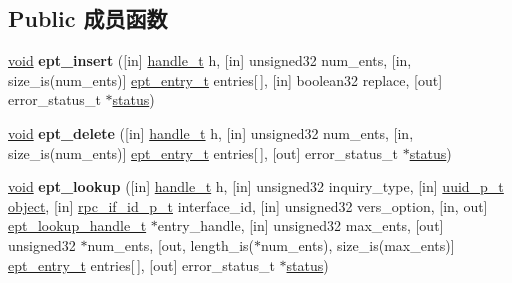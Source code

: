 \subsection*{Public 成员函数}
\begin{DoxyCompactItemize}
\item 
\mbox{\label{interfaceepm_a60394e4aeadf34ac922f81f2950dc4c7}} 
\hyperlink{interfacevoid}{void} {\bfseries ept\+\_\+insert} (\mbox{[}in\mbox{]} \hyperlink{interfacevoid}{handle\+\_\+t} h, \mbox{[}in\mbox{]} unsigned32 num\+\_\+ents, \mbox{[}in, size\+\_\+is(num\+\_\+ents)\mbox{]} \hyperlink{structepm_1_1ept__entry__t}{ept\+\_\+entry\+\_\+t} entries\mbox{[}$\,$\mbox{]}, \mbox{[}in\mbox{]} boolean32 replace, \mbox{[}out\mbox{]} error\+\_\+status\+\_\+t $\ast$\hyperlink{structstatus}{status})
\item 
\mbox{\label{interfaceepm_a5c89ac83dbaa05e366c88149b9bffb86}} 
\hyperlink{interfacevoid}{void} {\bfseries ept\+\_\+delete} (\mbox{[}in\mbox{]} \hyperlink{interfacevoid}{handle\+\_\+t} h, \mbox{[}in\mbox{]} unsigned32 num\+\_\+ents, \mbox{[}in, size\+\_\+is(num\+\_\+ents)\mbox{]} \hyperlink{structepm_1_1ept__entry__t}{ept\+\_\+entry\+\_\+t} entries\mbox{[}$\,$\mbox{]}, \mbox{[}out\mbox{]} error\+\_\+status\+\_\+t $\ast$\hyperlink{structstatus}{status})
\item 
\mbox{\label{interfaceepm_a409b2be128843f25059a8392f8249bb1}} 
\hyperlink{interfacevoid}{void} {\bfseries ept\+\_\+lookup} (\mbox{[}in\mbox{]} \hyperlink{interfacevoid}{handle\+\_\+t} h, \mbox{[}in\mbox{]} unsigned32 inquiry\+\_\+type, \mbox{[}in\mbox{]} \hyperlink{interface_g_u_i_d}{uuid\+\_\+p\+\_\+t} \hyperlink{structobject}{object}, \mbox{[}in\mbox{]} \hyperlink{structrpc__if__id__t}{rpc\+\_\+if\+\_\+id\+\_\+p\+\_\+t} interface\+\_\+id, \mbox{[}in\mbox{]} unsigned32 vers\+\_\+option, \mbox{[}in, out\mbox{]} \hyperlink{interfacevoid}{ept\+\_\+lookup\+\_\+handle\+\_\+t} $\ast$entry\+\_\+handle, \mbox{[}in\mbox{]} unsigned32 max\+\_\+ents, \mbox{[}out\mbox{]} unsigned32 $\ast$num\+\_\+ents, \mbox{[}out, length\+\_\+is($\ast$num\+\_\+ents), size\+\_\+is(max\+\_\+ents)\mbox{]} \hyperlink{structepm_1_1ept__entry__t}{ept\+\_\+entry\+\_\+t} entries\mbox{[}$\,$\mbox{]}, \mbox{[}out\mbox{]} error\+\_\+status\+\_\+t $\ast$\hyperlink{structstatus}{status})
\item 
\mbox{\label{interfaceepm_a938a8ec7bf13b5f1f65f6a7df9593ac4}} 

\end{DoxyCompactItemize}
